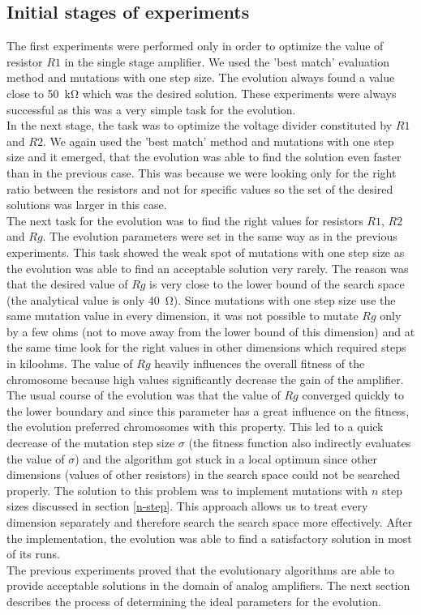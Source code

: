 \subsection{Initial stages of experiments}
The first experiments were performed only in order to optimize the value of resistor $R1$ in the single stage amplifier. We used the 'best match' evaluation method and mutations with one step size. The evolution always found a value close to \SI{50}{\kilo\ohm} which was the desired solution. These experiments were always successful as this was a very simple task for the evolution.\\
In the next stage, the task was to optimize the voltage divider constituted by $R1$ and $R2$. We again used the 'best match' method and mutations with one step size and it emerged, that the evolution was able to find the solution even faster than in the previous case. This was because we were looking only for the right ratio between the resistors and not for specific values so the set of the desired solutions was larger in this case.\\
The next task for the evolution was to find the right values for resistors $R1$, $R2$ and $Rg$. The evolution parameters were set in the same way as in the previous experiments. This task showed the weak spot of mutations with one step size as the evolution was able to find an acceptable solution very rarely. The reason was that the desired value of $Rg$ is very close to the lower bound of the search space (the analytical value is only \SI{40}{\ohm}). Since mutations with one step size use the same mutation value in every dimension, it was not possible to mutate $Rg$ only by a few ohms (not to move away from the lower bound of this dimension) and at the same time look for the right values in other dimensions which required steps in kiloohms. The value of $Rg$ heavily influences the overall fitness of the chromosome because high values significantly decrease the gain of the amplifier. The usual course of the evolution was that the value of $Rg$ converged quickly to the lower boundary and since this parameter has a great influence on the fitness, the evolution preferred chromosomes with this property. This led to a quick decrease of the mutation step size $\sigma$ (the fitness function also indirectly evaluates the value of $\sigma$) and the algorithm got stuck in a local optimum since other dimensions (values of other resistors) in the search space could not be searched properly. The solution to this problem was to implement mutations with $n$ step sizes discussed in section \ref{n-step}. This approach allows us to treat every dimension separately and therefore search the search space more effectively. After the implementation, the evolution was able to find a satisfactory solution in most of its runs.\\
The previous experiments proved that the evolutionary algorithms are able to provide acceptable solutions in the domain of analog amplifiers. The next section describes the process of determining the ideal parameters for the evolution.

